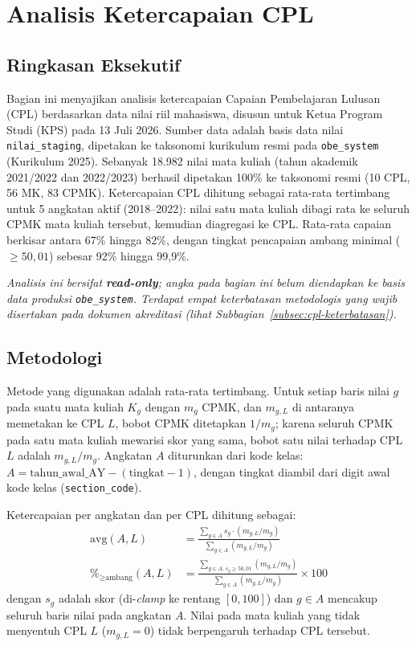 \section{Analisis Ketercapaian CPL}

\subsection{Ringkasan Eksekutif}

Bagian ini menyajikan analisis ketercapaian Capaian Pembelajaran Lulusan (CPL) berdasarkan data nilai riil mahasiswa, disusun untuk Ketua Program Studi (KPS) pada 13 Juli 2026. Sumber data adalah basis data nilai \texttt{nilai\_staging}, dipetakan ke taksonomi kurikulum resmi pada \texttt{obe\_system} (Kurikulum 2025). Sebanyak 18.982 nilai mata kuliah (tahun akademik 2021/2022 dan 2022/2023) berhasil dipetakan 100\% ke taksonomi resmi (10 CPL, 56 MK, 83 CPMK). Ketercapaian CPL dihitung sebagai rata-rata tertimbang untuk 5 angkatan aktif (2018--2022): nilai satu mata kuliah dibagi rata ke seluruh CPMK mata kuliah tersebut, kemudian diagregasi ke CPL. Rata-rata capaian berkisar antara 67\% hingga 82\%, dengan tingkat pencapaian ambang minimal (\(\geq 50{,}01\)) sebesar 92\% hingga 99,9\%.

\textit{Analisis ini bersifat \textbf{read-only}; angka pada bagian ini belum diendapkan ke basis data produksi \texttt{obe\_system}. Terdapat empat keterbatasan metodologis yang wajib disertakan pada dokumen akreditasi (lihat Subbagian~\ref{subsec:cpl-keterbatasan}).}

\subsection{Metodologi}

Metode yang digunakan adalah rata-rata tertimbang. Untuk setiap baris nilai $g$ pada suatu mata kuliah $K_g$ dengan $m_g$ CPMK, dan $m_{g,L}$ di antaranya memetakan ke CPL $L$, bobot CPMK ditetapkan $1/m_g$; karena seluruh CPMK pada satu mata kuliah mewarisi skor yang sama, bobot satu nilai terhadap CPL $L$ adalah $m_{g,L}/m_g$. Angkatan $A$ diturunkan dari kode kelas: $A = \text{tahun\_awal\_AY} - (\text{tingkat} - 1)$, dengan tingkat diambil dari digit awal kode kelas (\texttt{section\_code}).

Ketercapaian per angkatan dan per CPL dihitung sebagai:
\begin{align*}
\mathrm{avg}(A,L) &= \frac{\sum_{g \in A} s_g \cdot (m_{g,L}/m_g)}{\sum_{g \in A} (m_{g,L}/m_g)} \\
\%_{\geq \text{ambang}}(A,L) &= \frac{\sum_{g \in A,\, s_g \geq 50{,}01} (m_{g,L}/m_g)}{\sum_{g \in A} (m_{g,L}/m_g)} \times 100
\end{align*}
dengan $s_g$ adalah skor (di-\textit{clamp} ke rentang $[0,100]$) dan $g \in A$ mencakup seluruh baris nilai pada angkatan $A$. Nilai pada mata kuliah yang tidak menyentuh CPL $L$ ($m_{g,L}=0$) tidak berpengaruh terhadap CPL tersebut.

